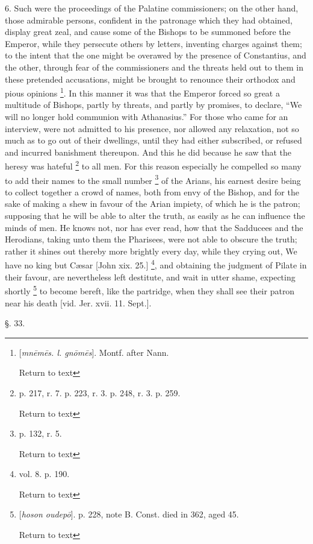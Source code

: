 6. Such were the proceedings of the Palatine
commissioners; on the other hand, those admirable persons, confident
in the patronage which they had obtained, display great zeal, and
cause some of the Bishops to be summoned before the Emperor, while
they persecute others by letters, inventing charges against them; to
the intent that the one might be overawed by the presence of
Constantius, and the other, through fear of the commissioners and the
threats held out to them in these pretended accusations, might be
brought to renounce their orthodox and pious opinions \footnote{[\emph{mn\={e}m\={e}s. l. gn\={o}m\={e}s}]. Montf. after
Nann.

Return to text}. In this manner it was that the Emperor forced so great a
multitude of Bishops, partly by threats, and partly by promises, to
declare, ``We will no longer hold communion with Athanasius.'' For
those who came for an interview, were not admitted to his presence,
nor allowed any relaxation, not so much as to go out of their
dwellings, until they had either subscribed, or refused and incurred
banishment thereupon. And this he did because he saw that the heresy
was hateful \footnote{p. 217, r. 7. p. 223, r. 3. p. 248, r. 3. p. 259.

Return to text} to all
men. For this reason especially he compelled so many to add their
names to the small number \footnote{p. 132, r. 5.

Return to text}
of the Arians, his earnest desire being to collect together a crowd of
names, both from envy of the Bishop, and for the sake of making a shew
in favour of the Arian impiety, of which he is the patron; supposing
that he will be able to alter the truth, as easily as he can influence
the minds of men. He knows not, nor has ever read, how that the
Sadducees and the Herodians, taking unto them the Pharisees, were not
able to obscure the truth; rather it shines out thereby more brightly
every day, while they crying out, We have no king but Cæsar [John xix.
25.] \footnote{vol. 8. p. 190.

Return to text}, and obtaining
the judgment of Pilate in their favour, are nevertheless left
destitute, and wait in utter shame, expecting shortly \footnote{[\emph{hoson oudep\={o}}]. p. 228, note B. Const. died in 362, aged
45.

Return to text} to become bereft, like the partridge, when they shall see
their patron near his death [vid. Jer. xvii. 11. Sept.].

§. 33.

